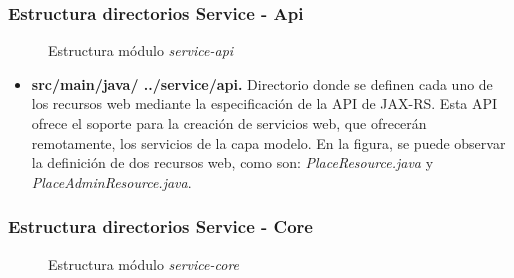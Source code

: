 \subsubsection*{Estructura directorios Service - Api}
\begin{figure}[H]
\centering
{}
\caption{Estructura módulo \textit{service-api}}
\end{figure}

\begin{itemize}
	\item \textbf{src/main/java/ ../service/api. } Directorio donde se definen cada uno de los recursos web mediante la especificación de la API de JAX-RS. Esta API ofrece el soporte para la creación de servicios web, que ofrecerán remotamente, los servicios de la capa modelo. En la figura, se puede observar la definición de dos recursos web, como son: \textit{PlaceResource.java} y \textit{PlaceAdminResource.java}.
\end{itemize}


\subsubsection*{Estructura directorios Service - Core}
\begin{figure}[H]
\centering
{}
\caption{Estructura módulo \textit{service-core}}
\end{figure}

